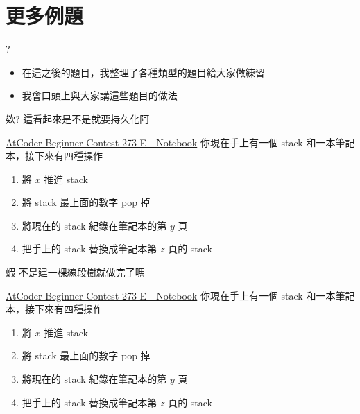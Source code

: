 \documentclass[aspectratio=169]{beamer}
\begin{document}
    \section{更多例題}

    \begin{frame}{?}
        \begin{itemize}
            \item 在這之後的題目，我整理了各種類型的題目給大家做練習
            \item 我會口頭上與大家講這些題目的做法
        \end{itemize}
    \end{frame}

    \begin{frame}{欸? 這看起來是不是就要持久化阿}
        \begin{block}{\href{https://atcoder.jp/contests/abc273/tasks/abc273_e}{AtCoder Beginner Contest 273 E - Notebook}}
            你現在手上有一個 stack 和一本筆記本，接下來有四種操作
            \begin{enumerate}
                \item 將 $x$ 推進 stack
                \item 將 stack 最上面的數字 pop 掉
                \item 將現在的 stack 紀錄在筆記本的第 $y$ 頁
                \item 把手上的 stack 替換成筆記本第 $z$ 頁的 stack
            \end{enumerate}
        \end{block}
    \end{frame}

    \begin{frame}{蝦 不是建一棵線段樹就做完了嗎}
        \begin{block}{\href{https://atcoder.jp/contests/abc273/tasks/abc273_e}{AtCoder Beginner Contest 273 E - Notebook}}
            你現在手上有一個 stack 和一本筆記本，接下來有四種操作
            \begin{enumerate}
                \item 將 $x$ 推進 stack
                \item 將 stack 最上面的數字 pop 掉
                \item 將現在的 stack 紀錄在筆記本的第 $y$ 頁
                \item 把手上的 stack 替換成筆記本第 $z$ 頁的 stack
            \end{enumerate}
        \end{block}
    \end{frame}
\end{document}
